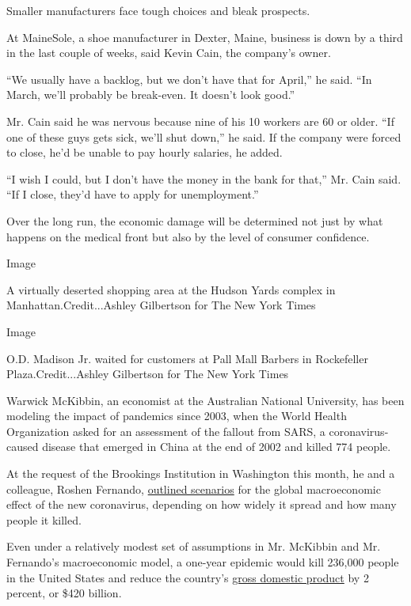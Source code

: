 Smaller manufacturers face tough choices and bleak prospects.

At MaineSole, a shoe manufacturer in Dexter, Maine, business is down by
a third in the last couple of weeks, said Kevin Cain, the company's
owner.

``We usually have a backlog, but we don't have that for April,'' he
said. ``In March, we'll probably be break-even. It doesn't look good.''

Mr. Cain said he was nervous because nine of his 10 workers are 60 or
older. ``If one of these guys gets sick, we'll shut down,'' he said. If
the company were forced to close, he'd be unable to pay hourly salaries,
he added.

``I wish I could, but I don't have the money in the bank for that,'' Mr.
Cain said. ``If I close, they'd have to apply for unemployment.''

Over the long run, the economic damage will be determined not just by
what happens on the medical front but also by the level of consumer
confidence.

Image

A virtually deserted shopping area at the Hudson Yards complex in
Manhattan.Credit...Ashley Gilbertson for The New York Times

Image

O.D. Madison Jr. waited for customers at Pall Mall Barbers in
Rockefeller Plaza.Credit...Ashley Gilbertson for The New York Times

Warwick McKibbin, an economist at the Australian National University,
has been modeling the impact of pandemics since 2003, when the World
Health Organization asked for an assessment of the fallout from SARS, a
coronavirus-caused disease that emerged in China at the end of 2002 and
killed 774 people.

At the request of the Brookings Institution in Washington this month, he
and a colleague, Roshen Fernando,
\href{https://www.brookings.edu/research/the-global-macroeconomic-impacts-of-covid-19-seven-scenarios/}{outlined
scenarios} for the global macroeconomic effect of the new coronavirus,
depending on how widely it spread and how many people it killed.

Even under a relatively modest set of assumptions in Mr. McKibbin and
Mr. Fernando's macroeconomic model, a one-year epidemic would kill
236,000 people in the United States and reduce the country's
\href{https://www.nytimes3xbfgragh.onion/2020/04/29/business/economy/us-gdp.html}{gross
domestic product} by 2 percent, or \$420 billion.


